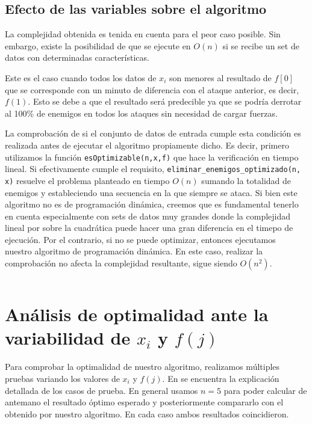 \documentclass{article}
\begin{document}
\subsection{Efecto de las variables sobre el algoritmo}
\label{sec:optimizacion}

La complejidad obtenida es tenida en cuenta para el peor caso posible. Sin embargo, existe la posibilidad de que se ejecute en $O(n)$ si se recibe un set de datos con determinadas características.

Este es el caso cuando todos los datos de $x_i$ son menores al resultado de $f[0]$ que se corresponde con un minuto de diferencia con el ataque anterior, es decir, $f(1)$. Esto se debe a que el resultado será predecible ya que se podría derrotar al 100\% de enemigos en todos los ataques sin necesidad de cargar fuerzas.

La comprobación de si el conjunto de datos de entrada cumple esta condición es realizada antes de ejecutar el algoritmo propiamente dicho. Es decir, primero utilizamos la función \texttt{esOptimizable(n,x,f)} que hace la verificación en tiempo lineal. Si efectivamente cumple el requisito, \texttt{eliminar\_enemigos\_optimizado(n, x)} resuelve el problema planteado en tiempo $O(n)$ sumando la totalidad de \\enemigos y estableciendo una secuencia en la que siempre se ataca. Si bien este algoritmo no es de programación dinámica, creemos que es fundamental tenerlo en cuenta especialmente con sets de datos muy grandes donde la complejidad lineal por sobre la cuadrática puede hacer una gran diferencia en el timepo de ejecución.
Por el contrario, si no se puede optimizar, entonces ejecutamos \\nuestro algoritmo de programación dinámica. En este caso, realizar la comprobación no afecta la complejidad resultante, sigue siendo $O(n^2)$.

\inputminted[linenos, firstline=4, lastline=23]{python}{codigo/algoritmo.py}

\section{Análisis de optimalidad ante la variabilidad de $x_i$ y $f(j)$}
\label{sec:optimalidad}
Para comprobar la optimalidad de nuestro algoritmo, realizamos múltiples pruebas variando los valores de $x_i$ y $f(j)$. En  se encuentra la explicación detallada de los casos de prueba. En general usamos $n = 5$ para poder calcular de antemano el resultado óptimo esperado y posteriormente compararlo con el obtenido por nuestro algoritmo. En cada caso ambos resultados coincidieron.
\end{document}
